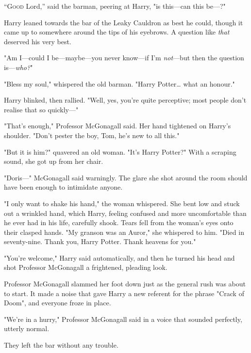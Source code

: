 
\lettrine{“G}{ood} Lord,'' said the barman, peering at Harry, "is this---can this be---?"

Harry leaned towards the bar of the Leaky Cauldron as best he could, though it
came up to somewhere around the tips of his eyebrows. A question like
\emph{that} deserved his very best.

"Am I---could I be---maybe---you never know---if I'm \emph{not}---but then the
question is---\emph{who?}"

"Bless my soul," whispered the old barman. "Harry Potter{\ldots} what an
honour."

Harry blinked, then rallied. "Well, yes, you're quite perceptive; most people
don't realise that so quickly---"

"That's enough," Professor McGonagall said. Her hand tightened on Harry's
shoulder. "Don't pester the boy, Tom, he's new to all this."

"But it is him?" quavered an old woman. "It's Harry Potter?" With a scraping
sound, she got up from her chair.

"Doris---" McGonagall said warningly. The glare she shot around the room should
have been enough to intimidate anyone.

"I only want to shake his hand," the woman whispered. She bent low and stuck
out a wrinkled hand, which Harry, feeling confused and more uncomfortable than
he ever had in his life, carefully shook. Tears fell from the woman's eyes onto
their clasped hands. "My granson was an Auror," she whispered to him. "Died in
seventy-nine. Thank you, Harry Potter. Thank heavens for you."

"You're welcome," Harry said automatically, and then he turned his head and
shot Professor McGonagall a frightened, pleading look.

Professor McGonagall slammed her foot down just as the general rush was about
to start. It made a noise that gave Harry a new referent for the phrase "Crack
of Doom", and everyone froze in place.

"We're in a hurry," Professor McGonagall said in a voice that sounded
perfectly, utterly normal.

They left the bar without any trouble.

